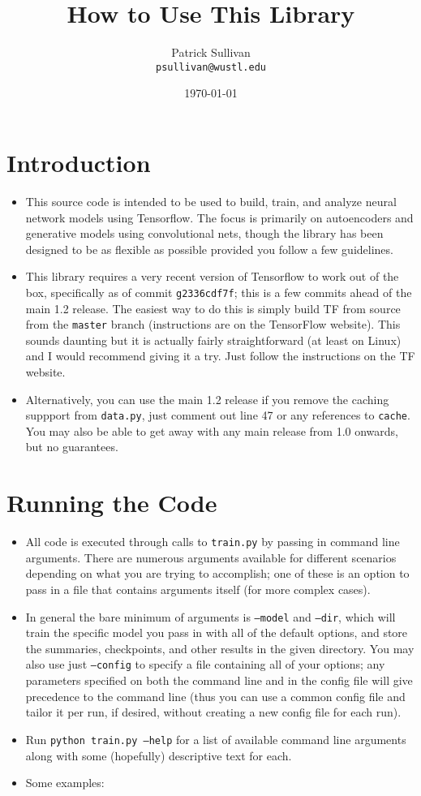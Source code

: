 \documentclass{article}
\date{\today}
\title{How to Use This Library}
\author{Patrick Sullivan\\\texttt{psullivan@wustl.edu}}
\begin{document}
\maketitle

\begin{flushleft}

  \section{Introduction}
  \begin{itemize}
  \item This source code is intended to be used to build, train, and analyze neural network models using Tensorflow. The focus is primarily on autoencoders and generative models using convolutional nets, though the library has been designed to be as flexible as possible provided you follow a few guidelines.
  \item This library requires a very recent version of Tensorflow to work out of the box, specifically as of commit \texttt{g2336cdf7f}; this is a few commits ahead of the main 1.2 release. The easiest way to do this is simply build TF from source from the \texttt{master} branch (instructions are on the TensorFlow website). This sounds daunting but it is actually fairly straightforward (at least on Linux) and I would recommend giving it a try. Just follow the instructions on the TF website. 
  \item Alternatively, you can use the main 1.2 release if you remove the caching suppport from \texttt{data.py}, just comment out line 47 or any references to \texttt{cache}. You may also be able to get away with any main release from 1.0 onwards, but no guarantees.
  \end{itemize}

  
  \section{Running the Code}
  \begin{itemize}
  \item All code is executed through calls to \texttt{train.py} by passing in command line arguments. There are numerous arguments available for different scenarios depending on what you are trying to accomplish; one of these is an option to pass in a file that contains arguments itself (for more complex cases). 
  \item In general the bare minimum of arguments is \texttt{--model} and \texttt{--dir}, which will train the specific model you pass in with all of the default options, and store the summaries, checkpoints, and other results in the given directory. You may also use just \texttt{--config} to specify a file containing all of your options; any parameters specified on both the command line and in the config file will give precedence to the command line (thus you can use a common config file and tailor it per run, if desired, without creating a new config file for each run).
  \item Run \texttt{python train.py --help} for a list of available command line arguments along with some (hopefully) descriptive text for each. 
  \item Some examples:


\end{itemize}
\end{flushleft}
\end{document}
